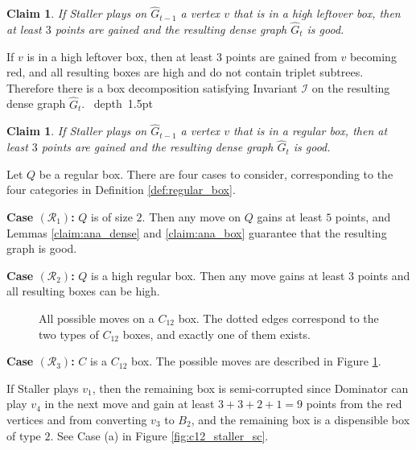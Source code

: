 \documentclass[11pt]{article}
\def\Proof{\par\noindent{\bf Proof:~}}
\def\blackslug{\hbox{\hskip 1pt \vrule width 4pt height 8pt
    depth 1.5pt \hskip 1pt}}
\def\QED{\quad\blackslug\lower 8.5pt\null\par}
\newtheorem{claim}[theorem]{Claim}
\theoremstyle{definition}
\def\regtwo{\mathcal{R}_1}
\def\regclean{\mathcal{R}_2}
\def\regct{\mathcal{R}_3}
\def\invboxes{\mathcal{I}}
\begin{document}
\begin{claim}
\label{claim:staller_clean_leftover}
If Staller plays on $\hat{G}_{t-1}$ a vertex $v$ that is in a high leftover box, then at least $3$ points are gained and the resulting dense graph $\hat{G}_t$ is good.
\end{claim}
\Proof
If $v$ is in a high leftover box, then at least $3$ points are gained from $v$ becoming red, and all resulting boxes are high and do not contain triplet subtrees.
Therefore there is a box decomposition satisfying Invariant $\invboxes$ on the resulting dense graph $\hat{G}_t$.
\QED

\begin{claim}
\label{claim:staller_regular}
If Staller plays on $\hat{G}_{t-1}$ a vertex $v$ that is in a regular box, then at least $3$ points are gained and the resulting dense graph $\hat{G}_t$ is good.
\end{claim}
\Proof
Let $Q$ be a regular box.
There are four cases to consider, corresponding to the four categories in Definition \ref{def:regular_box}.

\bigskip
\par\noindent
{\bf Case $(\regtwo)$:}
$Q$ is of size $2$.
Then any move on $Q$ gains at least $5$ points, and Lemmas \ref{claim:ana_dense} and \ref{claim:ana_box} guarantee that the resulting graph is good.

\bigskip
\par\noindent
{\bf Case $(\regclean)$:}
$Q$ is a high regular box.
Then any move gains at least $3$ points and all resulting boxes can be high.

\begin{figure}[t]
  \caption{\sf All possible moves on a $C_{12}$ box. The dotted edges correspond to the two types of $C_{12}$ boxes, and exactly one of them exists.}
  \medskip
  \centering
  \label{fig:c12_staller}
\end{figure}

\bigskip
\par\noindent
{\bf Case $(\regct)$:}
$C$ is a $C_{12}$ box.
The possible moves are described in Figure \ref{fig:c12_staller}.

If Staller plays $v_1$, 
then the remaining box is semi-corrupted since Dominator can play $v_4$ in the next move and gain at least $3 + 3 + 2 + 1 = 9$ points from the red vertices and from converting $v_3$ to $B_2$, 
and the remaining box is a dispensible box of type $2$. 
See Case (a) in Figure \ref{fig:c12_staller_sc}.
\end{document}
